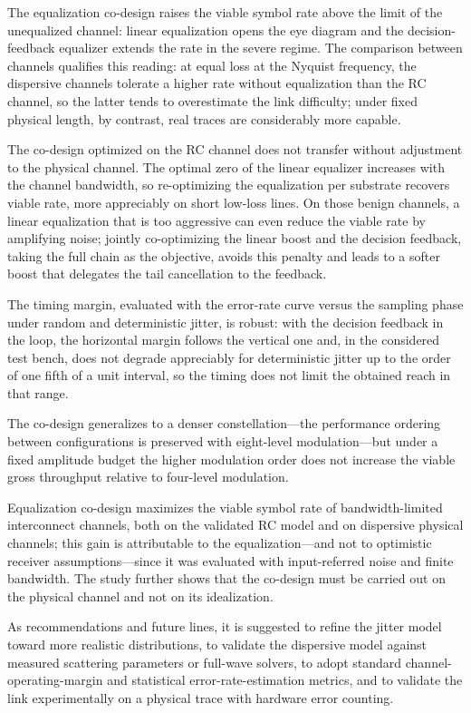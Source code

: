 \documentclass[preprint,review,12pt]{elsarticle}
\begin{document}
The equalization co-design raises the viable symbol rate above the limit of
the unequalized channel: linear equalization opens the eye diagram and the
decision-feedback equalizer extends the rate in the severe regime. The
comparison between channels qualifies this reading: at equal loss at the
Nyquist frequency, the dispersive channels tolerate a higher rate without
equalization than the RC channel, so the latter tends to overestimate the
link difficulty; under fixed physical length, by contrast, real traces are
considerably more capable.

The co-design optimized on the RC channel does not transfer without
adjustment to the physical channel. The optimal zero of the linear
equalizer increases with the channel bandwidth, so re-optimizing the
equalization per substrate recovers viable rate, more appreciably on short
low-loss lines. On those benign channels, a linear equalization that is too
aggressive can even reduce the viable rate by amplifying noise; jointly
co-optimizing the linear boost and the decision feedback, taking the full
chain as the objective, avoids this penalty and leads to a softer boost
that delegates the tail cancellation to the feedback.

The timing margin, evaluated with the error-rate curve versus the sampling
phase under random and deterministic jitter, is robust: with the decision
feedback in the loop, the horizontal margin follows the vertical one and,
in the considered test bench, does not degrade appreciably for
deterministic jitter up to the order of one fifth of a unit interval, so
the timing does not limit the obtained reach in that range.

The co-design generalizes to a denser constellation---the performance
ordering between configurations is preserved with eight-level
modulation---but under a fixed amplitude budget the higher modulation order
does not increase the viable gross throughput relative to four-level
modulation.

Equalization co-design maximizes the viable symbol rate of
bandwidth-limited interconnect channels, both on the validated RC model and
on dispersive physical channels; this gain is attributable to the
equalization---and not to optimistic receiver assumptions---since it was
evaluated with input-referred noise and finite bandwidth. The study further
shows that the co-design must be carried out on the physical channel and
not on its idealization.

As recommendations and future lines, it is suggested to refine the jitter
model toward more realistic distributions, to validate the dispersive model
against measured scattering parameters or full-wave solvers, to adopt
standard channel-operating-margin and statistical error-rate-estimation
metrics, and to validate the link experimentally on a physical trace with
hardware error counting.
\end{document}
